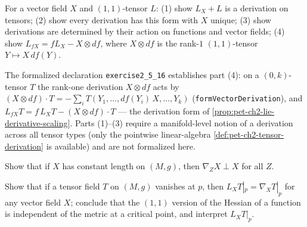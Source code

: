 \begin{remark}
  \label{rem:pet-ch2-ex-16}
  \leanok
  For a vector field $X$ and $(1,1)$-tensor $L$: (1) show $L_X+L$ is a
  derivation on tensors; (2) show every derivation has this form with $X$
  unique; (3) show derivations are determined by their action on functions and
  vector fields; (4) show $L_{fX}=fL_X-X\otimes df$, where $X\otimes df$ is
  the rank-$1$ $(1,1)$-tensor $Y\mapsto X\,df(Y)$.

  The formalized declaration \texttt{exercise2\_5\_16} establishes part (4): on
  a $(0,k)$-tensor $T$ the rank-one derivation $X\otimes df$ acts by
  $(X\otimes df)\cdot T=-\sum_i T(Y_1,\dots,df(Y_i)\,X,\dots,Y_k)$
  (\texttt{formVectorDerivation}), and $L_{fX}T=f\,L_XT-(X\otimes df)\cdot T$ —
  the derivation form of \cref{prop:pet-ch2-lie-derivative-scaling}. Parts
  (1)–(3) require a manifold-level notion of a derivation across all tensor
  types (only the pointwise linear-algebra \cref{def:pet-ch2-tensor-derivation}
  is available) and are not formalized here.
\end{remark}

\begin{remark}
  \label{rem:pet-ch2-ex-17}
  \leanok
  Show that if $X$ has constant length on $(M,g)$, then $\nabla_ZX\perp X$ for
  all $Z$.
\end{remark}

\begin{remark}
  \label{rem:pet-ch2-ex-18}
  \leanok
  Show that if a tensor field $T$ on $(M,g)$ vanishes at $p$, then
  $L_XT|_p=\nabla_XT|_p$ for any vector field $X$; conclude that the $(1,1)$
  version of the Hessian of a function is independent of the metric at a
  critical point, and interpret $L_XT|_p$.
\end{remark}

